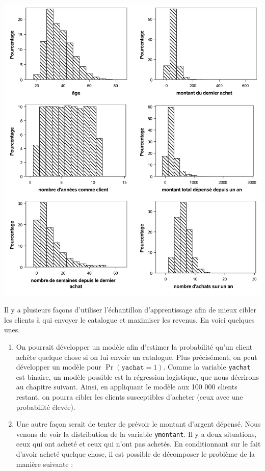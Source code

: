 \documentclass[
  11pt,
  letterpaper,
]{book}
\providecommand{\tightlist}{%
  \setlength{\itemsep}{0pt}\setlength{\parskip}{0pt}}
\theoremstyle{definition}
\theoremstyle{definition}
\theoremstyle{definition}
\theoremstyle{definition}
\theoremstyle{remark}
\begin{document}
\begin{center}\includegraphics[width=0.9\linewidth]{figures/02-select-e6} \end{center}

Il y a plusieurs façons d'utiliser l'échantillon d'apprentissage afin de mieux cibler les clients à qui envoyer le catalogue et maximiser les revenus. En voici quelques unes.

\begin{enumerate}
\def\labelenumi{\alph{enumi})}
\tightlist
\item
  On pourrait développer un modèle afin d'estimer la probabilité qu'un client achète quelque chose si on lui envoie un catalogue. Plus précisément, on peut développer un modèle pour \(\Pr(\texttt{yachat}=1)\). Comme la variable \texttt{yachat} est binaire, un modèle possible est la régression logistique, que nous décrirons au chapitre suivant. Ainsi, en appliquant le modèle aux 100 000 clients restant, on pourra cibler les clients susceptibles d'acheter (ceux avec une probabilité élevée).
\item
  Une autre façon serait de tenter de prévoir le montant d'argent dépensé. Nous venons de voir la distribution de la variable \texttt{ymontant}. Il y a deux situations, ceux qui ont acheté et ceux qui n'ont pas achetés. En conditionnant sur le fait d'avoir acheté quelque chose, il est possible de décomposer le problème de la manière suivante :
\end{enumerate}
\end{document}
